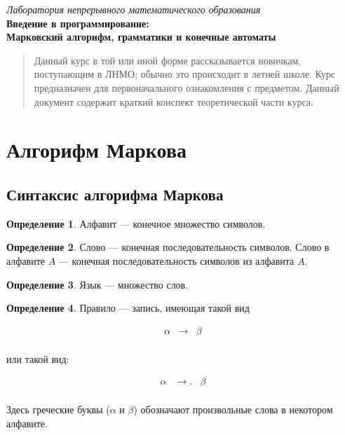 \documentclass[12pt,a4paper,oneside]{article}
\begin{document}
\theoremstyle{definition}
\newtheorem{definition}{Определение}[section]

\begin{center}
{\textit { Лаборатория непрерывного математического образования}\\
\textbf{\large{Введение в программирование:}\\\vspace{1mm}
{\Large Марковский алгорифм, грамматики и конечные автоматы}}\\\vspace{2mm}}
\end{center}

\begin{abstract}
Данный курс в той или иной форме рассказывается новичкам, поступающим в ЛНМО;
обычно это происходит в летней школе. 
Курс предназначен для первоначального ознакомления с предметом.
Данный документ содержит краткий конспект теоретической части курса.
\end{abstract}

\section{Алгорифм Маркова}

\subsection{Синтаксис алгорифма Маркова}

\begin{definition}Алфавит --- конечное множество символов.
\end{definition}

\begin{definition}Слово --- конечная последовательность символов. Слово в алфавите $A$ ---
конечная последовательность символов из алфавита $A$.
\end{definition}

\begin{definition}Язык --- множество слов.
\end{definition}

\begin{definition}Правило --- запись, имеющая такой вид 
\begin{bnf}\begin{eqnarray*}
\alpha&\rightarrow&\beta\\
\end{eqnarray*}\end{bnf}
\vspace{-1cm}

или такой вид:
\begin{bnf}\begin{eqnarray*}
\alpha&\rightarrow.&\beta\\
\end{eqnarray*}\end{bnf}

\vspace{-1cm}
Здесь греческие буквы ($\alpha$ и $\beta$) обозначают произвольные слова в некотором алфавите.

\end{definition}
\end{document}
